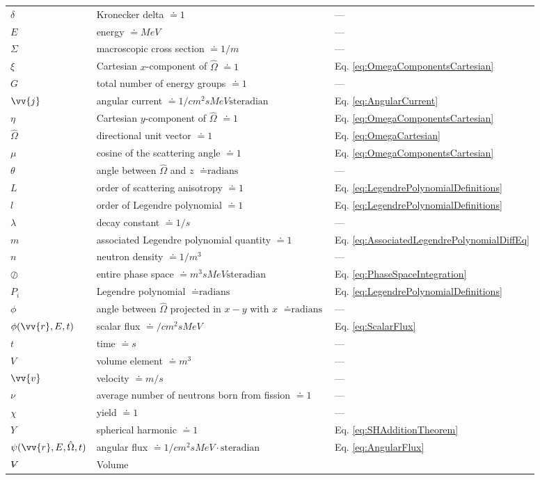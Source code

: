 \documentclass[10pt]{article}
\newcommand{\hO}{\hat{\Omega}}
\newcommand{\spa}{(\vv{r}, E, \hO, t)}
\newcommand{\spas}{(\vv{r},E,t)}
\newcommand{\volume}{\mathop{\ooalign{\hfil$V$\hfil\cr\kern0.08em--\hfil\cr}}\nolimits}
\begin{document}
\begin{flushleft}
\begin{tabular}{l l l}
\(\delta\) & Kronecker delta \(\doteq 1\) & ---\\
\(E\) & energy \(\doteq MeV\) & ---\\
\(\Sigma\) & macroscopic cross section \(\doteq 1/m\) & ---\\
\(\xi\) & Cartesian \(x\)-component of \(\hO  \) \(\doteq 1\) & Eq. \ref{eq:OmegaComponentsCartesian}\\
\(G\) & total number of energy groups \(\doteq 1\) & ---\\
\(\vv{j}\) & angular current \(\doteq 1/cm^2sMeV\textrm{steradian}\) & Eq. \ref{eq:AngularCurrent}\\
\(\eta\) & Cartesian \(y\)-component of \(\hO  \) \(\doteq 1\) & Eq. \ref{eq:OmegaComponentsCartesian}\\
\(\hO  \) & directional unit vector \(\doteq 1\) & Eq. \ref{eq:OmegaCartesian}\\
\(\mu\) & cosine of the scattering angle \(\doteq 1\) & Eq. \ref{eq:OmegaComponentsCartesian}\\
\(\theta\) & angle between \(\hO  \) and \(z\) \(\doteq \textrm{radians}\) & ---\\
\(L\) & order of scattering anisotropy \(\doteq 1\) & Eq. \ref{eq:LegendrePolynomialDefinitions}\\
\(l\) & order of Legendre polynomial \(\doteq 1\) & Eq. \ref{eq:LegendrePolynomialDefinitions}\\
\(\lambda\) & decay constant \(\doteq 1/s\) & ---\\
\(m\) & associated Legendre polynomial quantity \(\doteq 1\) & Eq. \ref{eq:AssociatedLegendrePolynomialDiffEq}\\
\(n\) & neutron density \(\doteq 1/m^3\) & ---\\
\(\oslash\) & entire phase space \(\doteq m^3sMeV\textrm{steradian}\) & Eq. \ref{eq:PhaseSpaceIntegration}\\
\(P_i\) & Legendre polynomial \(\doteq \textrm{radians}\) & Eq. \ref{eq:LegendrePolynomialDefinitions}\\
\(\phi\) & angle between \(\hO  \) projected in \(x-y\) with \(x\) \(\doteq \textrm{radians}\) & ---\\
\(\phi\spas\) & scalar flux \(\doteq /cm^2sMeV\) & Eq. \ref{eq:ScalarFlux}\\
\(t\) & time \(\doteq s\) & ---\\
\(V\) & volume element \(\doteq m^3\) & ---\\
\(\vv{v}\) & velocity \(\doteq m/s\) & ---\\
\(\nu\) & average number of neutrons born from fission \(\doteq 1\) & ---\\
\(\chi\) & yield \(\doteq 1\) & ---\\
\(Y\) & spherical harmonic \(\doteq 1\) & Eq. \ref{eq:SHAdditionTheorem}\\
\(\psi\spa \) & angular flux \(\doteq 1/cm^2sMeV\cdot\textrm{steradian}\) & Eq. \ref{eq:AngularFlux}\\
\(\volume\) & Volume\\


\end{tabular}
\end{flushleft}
\end{document}
